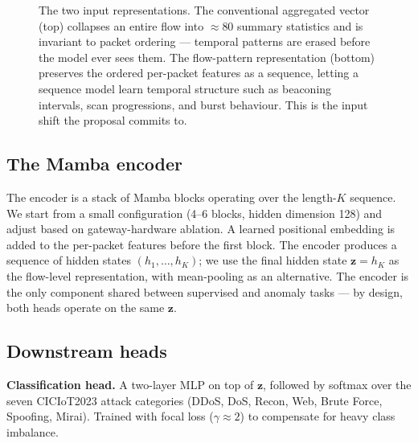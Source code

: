 \documentclass[11pt,a4paper]{article}
\begin{document}
\begin{figure}[H]
\caption{The two input representations. The conventional aggregated vector (top) collapses an entire flow into $\approx$80 summary statistics and is invariant to packet ordering --- temporal patterns are erased before the model ever sees them. The flow-pattern representation (bottom) preserves the ordered per-packet features as a sequence, letting a sequence model learn temporal structure such as beaconing intervals, scan progressions, and burst behaviour. This is the input shift the proposal commits to.}
\label{fig:representation}
\end{figure}

\subsection{The Mamba encoder}
The encoder is a stack of Mamba blocks operating over the length-$K$ sequence. We start from a small configuration (4--6 blocks, hidden dimension 128) and adjust based on gateway-hardware ablation. A learned positional embedding is added to the per-packet features before the first block. The encoder produces a sequence of hidden states $(h_1, \ldots, h_K)$; we use the final hidden state $\mathbf{z} = h_K$ as the flow-level representation, with mean-pooling as an alternative. The encoder is the only component shared between supervised and anomaly tasks --- by design, both heads operate on the same $\mathbf{z}$.

\subsection{Downstream heads}
\textbf{Classification head.} A two-layer MLP on top of $\mathbf{z}$, followed by softmax over the seven CICIoT2023 attack categories (DDoS, DoS, Recon, Web, Brute Force, Spoofing, Mirai). Trained with focal loss ($\gamma\!\approx\!2$) to compensate for heavy class imbalance.
\end{document}
